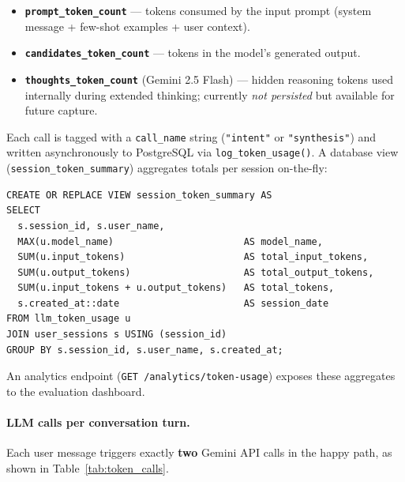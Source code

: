 \documentclass[12pt,a4paper]{article}
\begin{document}
\begin{itemize}
  \item \textbf{\texttt{prompt\_token\_count}} --- tokens consumed by
    the input prompt (system message + few-shot examples + user
    context).
  \item \textbf{\texttt{candidates\_token\_count}} --- tokens in the
    model's generated output.
  \item \textbf{\texttt{thoughts\_token\_count}} (Gemini 2.5 Flash) ---
    hidden reasoning tokens used internally during extended thinking;
    currently \emph{not persisted} but available for future capture.
\end{itemize}

Each call is tagged with a \texttt{call\_name} string
(\texttt{"intent"} or \texttt{"synthesis"}) and written
asynchronously to PostgreSQL via \texttt{log\_token\_usage()}.
A database view (\texttt{session\_token\_summary}) aggregates totals
per session on-the-fly:

\begin{verbatim}
CREATE OR REPLACE VIEW session_token_summary AS
SELECT
  s.session_id, s.user_name,
  MAX(u.model_name)                       AS model_name,
  SUM(u.input_tokens)                     AS total_input_tokens,
  SUM(u.output_tokens)                    AS total_output_tokens,
  SUM(u.input_tokens + u.output_tokens)   AS total_tokens,
  s.created_at::date                      AS session_date
FROM llm_token_usage u
JOIN user_sessions s USING (session_id)
GROUP BY s.session_id, s.user_name, s.created_at;
\end{verbatim}

An analytics endpoint (\texttt{GET /analytics/token-usage})
exposes these aggregates to the evaluation dashboard.

\paragraph{LLM calls per conversation turn.}

Each user message triggers exactly \textbf{two} Gemini API calls
in the happy path, as shown in Table~\ref{tab:token_calls}.
\end{document}
